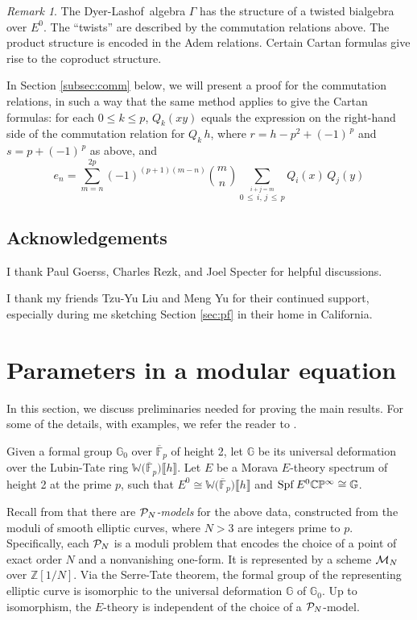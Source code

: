 \documentclass{gtpart}
\theoremstyle{definition}
\theoremstyle{remark}
\newtheorem{rmk}[equation]{Remark}
\newcommand{\mb}[1]{\mathbb{#1}}
\newcommand{\Spf}{{\rm Spf\thinspace}}
\newcommand{\cF}{\overline {\mb F}}
\newcommand{\CM}{{\cal M}}
\newcommand{\CP}{{\cal P}}
\newcommand{\DL}{Dyer-Lashof~}
\newcommand{\BC}{{\mb C}}
\newcommand{\BG}{{\mb G}}
\newcommand{\BP}{{\mb P}}
\newcommand{\BW}{{\mb W}}
\newcommand{\BZ}{{\mb Z}}
\newcommand{\G}{\Gamma}
\newcommand{\lb}{\llbracket}
\newcommand{\rb}{\rrbracket}
\renewcommand{\=}{\approx}
\renewcommand{\-}{\sim}
\newcommand{\ch}[2]{{#1 \choose #2}}
\numberwithin{equation}{section}
\begin{document}
\begin{rmk}
 The \DL algebra $\G$ has the structure of a twisted bialgebra over $E^0$.  The 
 ``twists'' are described by the commutation relations above.  The product 
 structure is encoded in the Adem relations.  Certain Cartan formulas give rise 
 to the coproduct structure.  

 In Section \ref{subsec:comm} below, we will present a proof for the commutation 
 relations, in such a way that the same method applies to give the Cartan 
 formulas: for each $0 \leq k \leq p$, $Q_k(x y)$ equals the expression on the 
 right-hand side of the commutation relation for $Q_k \, h$, where 
 $r = h - p^2 + (-1)^{\,p}$ and $s = p + (-1)^{\,p}$ as above, and 
 \[
  e_n = \sum_{m = n}^{2 p} (-1)^{(p + 1) (m - n)} \ch{m}{n} 
  \sum_{\stackrel{\scriptstyle i + j = m}{0 \,\leq\, i, \, j \,\leq\, p}} 
  Q_i(x) \, Q_j(y) 
 \]
\end{rmk}



\subsection{Acknowledgements}

I thank Paul Goerss, Charles Rezk, and Joel Specter for helpful discussions.  

I thank my friends Tzu-Yu Liu and Meng Yu for their continued support, 
especially during me sketching Section \ref{sec:pf} in their home in California.  



\section{Parameters in a modular equation}
\label{sec:parameter}

In this section, we discuss preliminaries needed for proving the main results.  
For some of the details, with examples, we refer the reader to 
\cite[Sections 2 and 3]{ho}.  

Given a formal group $\BG_0$ over $\cF_p$ of height 2, let $\BG$ be its 
universal deformation over the Lubin-Tate ring $\BW\big(\cF_p\big) \lb h \rb$.  
Let $E$ be a Morava $E$-theory spectrum of height 2 at the prime $p$, such that 
$E^0 \cong \BW\big(\cF_p\big) \lb h \rb$ and $\Spf E^0 \BC\BP^\infty \cong \BG$.  

Recall from \cite[Section 2.1]{ho} that there are {\em $\CP_N$-models} for the 
above data, constructed from the moduli of smooth elliptic curves, where $N > 3$ 
are integers prime to $p$.  Specifically, each $\CP_N$ is a moduli problem that 
encodes the choice of a point of exact order $N$ and a nonvanishing one-form.  
It is represented by a scheme $\CM_N$ over $\BZ[1/N]$.  Via the Serre-Tate 
theorem, the formal group of the representing elliptic curve is isomorphic to 
the universal deformation $\BG$ of $\BG_0$.  Up to isomorphism, the $E$-theory 
is independent of the choice of a $\CP_N$-model.  
\end{document}
